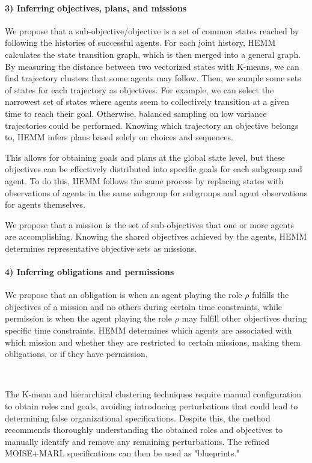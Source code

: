 \documentclass[sigconf,anonymous]{aamas}
\begin{document}
\paragraph{\textbf{3) Inferring objectives, plans, and missions}}

We propose that a sub-objective/objective is a set of common states reached by following the histories of successful agents.
For each joint history, HEMM calculates the state transition graph, which is then merged into a general graph. By measuring the distance between two vectorized states with K-means, we can find trajectory clusters that some agents may follow. Then, we sample some sets of states for each trajectory as objectives. For example, we can select the narrowest set of states where agents seem to collectively transition at a given time to reach their goal. Otherwise, balanced sampling on low variance trajectories could be performed. Knowing which trajectory an objective belongs to, HEMM infers plans based solely on choices and sequences.

This allows for obtaining goals and plans at the global state level, but these objectives can be effectively distributed into specific goals for each subgroup and agent. To do this, HEMM follows the same process by replacing states with observations of agents in the same subgroup for subgroups and agent observations for agents themselves.

We propose that a mission is the set of sub-objectives that one or more agents are accomplishing.
Knowing the shared objectives achieved by the agents, HEMM determines representative objective sets as missions.

\paragraph{\textbf{4) Inferring obligations and permissions}}

We propose that an obligation is when an agent playing the role $\rho$ fulfills the objectives of a mission and no others during certain time constraints, while permission is when the agent playing the role $\rho$ may fulfill other objectives during specific time constraints.
HEMM determines which agents are associated with which mission and whether they are restricted to certain missions, making them obligations, or if they have permission.

\

The K-mean and hierarchical clustering techniques require manual configuration to obtain roles and goals, avoiding introducing perturbations that could lead to determining false organizational specifications. Despite this, the method recommends thoroughly understanding the obtained roles and objectives to manually identify and remove any remaining perturbations. The refined MOISE+MARL specifications can then be used as "blueprints."
\end{document}
